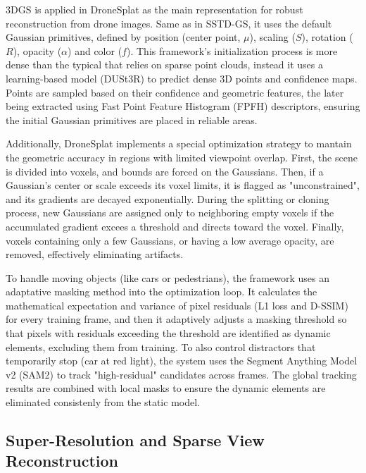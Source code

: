 \documentclass[
	a4paper, %
	10pt, %
	unnumberedsections, %
	twoside, %
]{LTJournalArticle}
\begin{document}
3DGS is applied in DroneSplat as the main representation for robust reconstruction from drone images. Same as in SSTD-GS, it uses the default Gaussian primitives, defined by position (center point, $\mu$), scaling ($S$), rotation ($R$), opacity ($\alpha$) and color ($f$). This framework's initialization process is more dense than the typical that relies on sparse point clouds, instead it uses a learning-based model (DUSt3R) to predict dense 3D points and confidence maps. Points are sampled based on their confidence and geometric features, the later being extracted using Fast Point Feature Histogram (FPFH) descriptors, ensuring the initial Gaussian primitives are placed in reliable areas.

Additionally, DroneSplat implements a special optimization strategy to mantain the geometric accuracy in regions with limited viewpoint overlap. First, the scene is divided into voxels, and bounds are forced on the Gaussians. Then, if a Gaussian's center or scale exceeds its voxel limits, it is flagged as "unconstrained", and its gradients are decayed exponentially. During the splitting or cloning process, new Gaussians are assigned only to neighboring empty voxels if the accumulated gradient excees a threshold and directs toward the voxel. Finally, voxels containing only a few Gaussians, or having a low average opacity, are removed, effectively eliminating artifacts.

To handle moving objects (like cars or pedestrians), the framework uses an adaptative masking method into the optimization loop. It calculates the mathematical expectation and variance of pixel residuals (L1 loss and D-SSIM) for every training frame, and then it adaptively adjusts a masking threshold so that pixels with residuals exceeding the threshold are identified as dynamic elements, excluding them from training. To also control distractors that temporarily stop (car at red light), the system uses the Segment Anything Model v2 (SAM2) to track "high-residual" candidates across frames. The global tracking results are combined with local masks to ensure the dynamic elements are eliminated consistenly from the static model.

\subsection{Super-Resolution and Sparse View Reconstruction}
\end{document}

